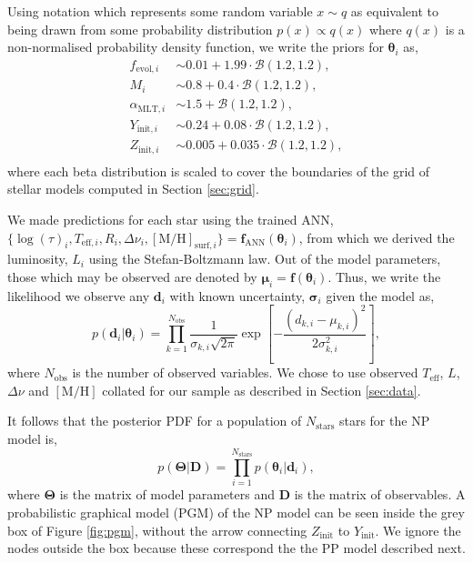 \documentclass[a4paper,fleqn,usenatbib]{mnras}
\newcommand{\dnu}{\ensuremath{\Delta\nu}}
\newcommand{\metallicity}{\ensuremath{[\mathrm{M}/\mathrm{H}]}}
\newcommand{\teff}{\ensuremath{T_\mathrm{eff}}}
\begin{document}
Using notation which represents some random variable $x \sim q$ as equivalent to being drawn from some probability distribution $p(x) \propto q(x)$ where $q(x)$ is a non-normalised probability density function, we write the priors for $\boldsymbol{\theta}_i$ as,
%
\begin{align*}
    f_{\mathrm{evol}, i} &\sim 0.01 + 1.99 \cdot \mathcal{B}(1.2, 1.2),\\
    M_i &\sim 0.8 + 0.4 \cdot \mathcal{B}(1.2, 1.2),\\
    \alpha_{\mathrm{MLT}, i} &\sim 1.5 + \mathcal{B}(1.2, 1.2),\\
    Y_{\mathrm{init}, i} &\sim 0.24 + 0.08 \cdot \mathcal{B}(1.2, 1.2),\\
    Z_{\mathrm{init}, i} &\sim 0.005 + 0.035 \cdot \mathcal{B}(1.2, 1.2),\\
\end{align*}
%
where each beta distribution is scaled to cover the boundaries of the grid of stellar models computed in Section \ref{sec:grid}.

We made predictions for each star using the trained ANN, $\{\log(\tau)_i, T_{\mathrm{eff}, i}, R_i, \dnu_i, \metallicity_{\mathrm{surf}, i}\} = \boldsymbol{f}_{\mathrm{ANN}}(\boldsymbol{\theta}_i)$, from which we derived the luminosity, $L_i$ using the Stefan-Boltzmann law. Out of the model parameters, those which may be observed are denoted by ${\boldsymbol{\mu}}_{i} = {\boldsymbol{f}}(\boldsymbol{\theta}_i)$. Thus, we write the likelihood we observe any $\boldsymbol{d}_i$ with known uncertainty, $\boldsymbol{\sigma}_{i}$ given the model as,
%
\begin{equation}
    p(\boldsymbol{d}_i | \boldsymbol{\theta}_i) = \prod_{k=1}^{N_\mathrm{obs}} \frac{1}{\sigma_{k, i} \sqrt{2\pi}} \exp\left[ - \frac{(d_{k, i} - \mu_{k, i})^2}{2 \sigma_{k, i}^2} \right],
    \label{eq:like}
\end{equation}
%
where $N_\mathrm{obs}$ is the number of observed variables. We chose to use observed $\teff$, $L$, $\dnu$ and $\metallicity$ collated for our sample as described in Section \ref{sec:data}.

It follows that the posterior PDF for a population of $N_\mathrm{stars}$ stars for the NP model is, 
%
\begin{equation}
    p(\boldsymbol{\Theta} | \boldsymbol{D}) = \prod_{i=1}^{N_{\mathrm{stars}}} p(\boldsymbol{\theta}_i | \boldsymbol{d}_i),   
\end{equation}
%
where $\boldsymbol{\Theta}$ is the matrix of model parameters and $\boldsymbol{D}$ is the matrix of observables. A probabilistic graphical model (PGM) of the NP model can be seen inside the grey box of Figure \ref{fig:pgm}, without the arrow connecting $Z_\mathrm{init}$ to $Y_\mathrm{init}$. We ignore the nodes outside the box because these correspond the the PP model described next.
\end{document}

